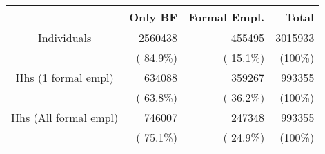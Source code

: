 \begin{tabular}{crr|r}
\toprule
 & Only BF & Formal Empl. & Total \\
\midrule
Individuals & 2560438 & 455495 & 3015933 \\
 & (     84.9\%) & (     15.1\%) & (100\%) \\
Hhs (1 formal empl) & 634088 & 359267 & 993355 \\
 & (     63.8\%) & (     36.2\%) & (100\%) \\
Hhs (All formal empl) & 746007 & 247348 & 993355 \\
 & (     75.1\%) & (     24.9\%) & (100\%) \\
\bottomrule
\end{tabular}
